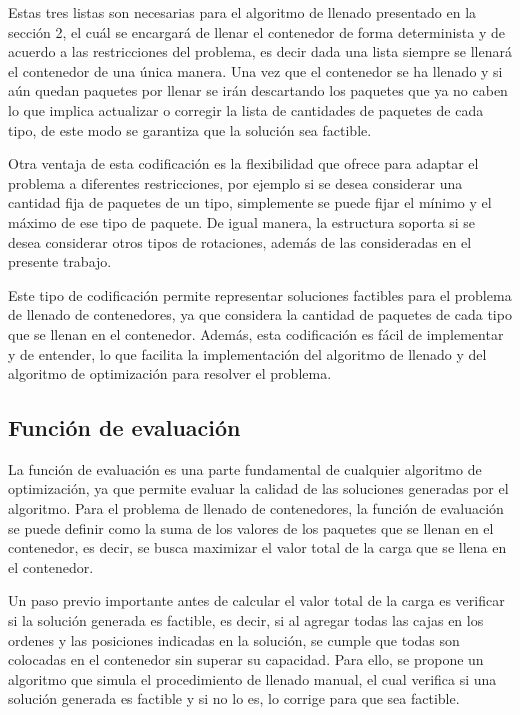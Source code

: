 Estas tres listas son necesarias para el algoritmo de llenado presentado en la sección 2, el cuál se encargará de llenar el contenedor de forma determinista y de acuerdo a las restricciones del problema, es decir dada una lista siempre se llenará el contenedor de una única manera. Una vez que el contenedor se ha llenado y si aún quedan paquetes por llenar se irán descartando los paquetes que ya no caben lo que implica actualizar o corregir la lista de cantidades de paquetes de cada tipo, de este modo se garantiza que la solución sea factible.

Otra ventaja de esta codificación es la flexibilidad que ofrece para adaptar el problema a diferentes restricciones, por ejemplo si se desea considerar una cantidad fija de paquetes de un tipo, simplemente se puede fijar el mínimo y el máximo de ese tipo de paquete. De igual manera, la estructura soporta si se desea considerar otros tipos de rotaciones, además de las consideradas en el presente trabajo.

Este tipo de codificación permite representar soluciones factibles para el problema de llenado de contenedores, ya que considera la cantidad de paquetes de cada tipo que se llenan en el contenedor. Además, esta codificación es fácil de implementar y de entender, lo que facilita la implementación del algoritmo de llenado y del algoritmo de optimización para resolver el problema.

\subsection{Función de evaluación}

La función de evaluación es una parte fundamental de cualquier algoritmo de optimización, ya que permite evaluar la calidad de las soluciones generadas por el algoritmo. Para el problema de llenado de contenedores, la función de evaluación se puede definir como la suma de los valores de los paquetes que se llenan en el contenedor, es decir, se busca maximizar el valor total de la carga que se llena en el contenedor.

Un paso previo importante antes de calcular el valor total de la carga es verificar si la solución generada es factible, es decir, si al agregar todas las cajas en los ordenes y las posiciones indicadas en la solución, se cumple que todas son colocadas en el contenedor sin superar su capacidad. Para ello, se propone un algoritmo que simula el procedimiento de llenado manual, el cual verifica si una solución generada es factible y si no lo es, lo corrige para que sea factible.

